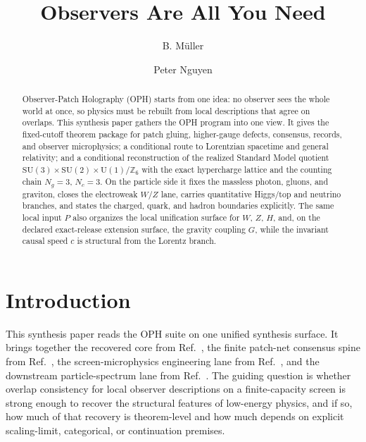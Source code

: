 \documentclass[11pt]{article}
\title{Observers Are All You Need}
\author{B. M\"uller \and Peter Nguyen}
\date{\OPHPaperReleaseDate}
\newcommand{\SU}{\mathrm{SU}}
\newcommand{\U}{\mathrm{U}}
\begin{document}
\maketitle
\OPHPaperReleaseBanner

\begin{abstract}
Observer-Patch Holography (OPH) starts from one idea: no observer sees the whole world at once, so physics must be rebuilt from local descriptions that agree on overlaps. This synthesis paper gathers the OPH program into one view. It gives the fixed-cutoff theorem package for patch gluing, higher-gauge defects, consensus, records, and observer microphysics; a conditional route to Lorentzian spacetime and general relativity; and a conditional reconstruction of the realized Standard Model quotient \(\SU(3)\times\SU(2)\times\U(1)/\mathbb Z_6\) with the exact hypercharge lattice and the counting chain \(N_g=3\), \(N_c=3\). On the particle side it fixes the massless photon, gluons, and graviton, closes the electroweak \(W/Z\) lane, carries quantitative Higgs/top and neutrino branches, and states the charged, quark, and hadron boundaries explicitly. The same local input \(P\) also organizes the local unification surface for \(W\), \(Z\), \(H\), and, on the declared exact-release extension surface, the gravity coupling \(G\), while the invariant causal speed \(c\) is structural from the Lorentz branch.
\end{abstract}

\tableofcontents
\newpage

\section{Introduction}

This synthesis paper reads the OPH suite on one unified synthesis surface. It brings
together the recovered core from Ref.~\cite{ophcompact}, the finite patch-net consensus spine from
Ref.~\cite{ophconsensus}, the screen-microphysics engineering lane from Ref.~\cite{ophmicrophysics},
and the downstream particle-spectrum lane from Ref.~\cite{ophparticles}. The guiding
question is whether overlap consistency for local observer descriptions on a finite-capacity screen
is strong enough to recover the structural features of low-energy physics, and if so, how much of
that recovery is theorem-level and how much depends on explicit scaling-limit,
categorical, or continuation premises.
\end{document}
